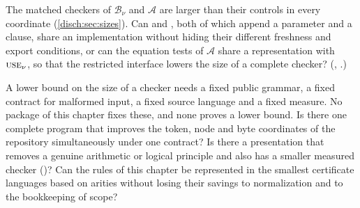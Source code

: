 \begin{question}
\label{disch:q:alias-size}
The matched checkers of $\mathcal B_{\nu}$ and $\mathcal A$ are larger than
their controls in every coordinate (\cref{disch:sec:sizes}). Can
 and , both of which append a parameter and
a clause, share an implementation without hiding their different freshness
and export conditions, or can the equation tests of $\mathcal A$ share a
representation with $\rulename{Use}_{\nu}$, so that the restricted
interface lowers the size of a complete checker? (,
.)
\end{question}

\begin{question}
A lower bound on the size of a checker needs a fixed public grammar, a
fixed contract for malformed input, a fixed source language and a fixed
measure. No package of this chapter fixes these, and none proves a lower
bound. Is there one complete program that improves the token, node and
byte coordinates of the repository simultaneously under one contract? Is
there a presentation that removes a genuine arithmetic or logical principle
and also has a smaller measured checker ()? Can
the rules of this chapter be represented in the smallest certificate
languages based on arities without losing their savings to normalization
and to the bookkeeping of scope?
\end{question}

